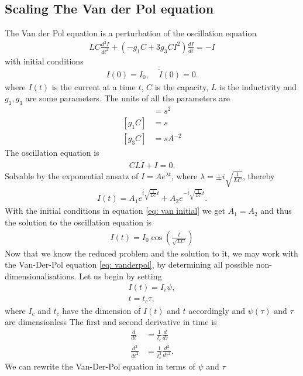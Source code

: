 \documentclass[a4paper]{article}
\begin{document}
\subsection{Scaling The Van der Pol equation}
The Van der Pol equation is a perturbation of the oscillation equation
\begin{align}\label{eq: vanderpol}
    LC\frac{d^2I}{dt^2} + (-g_1C +3g_3CI^2)\frac{dI}{dt} = -I
\end{align}
with initial conditions
\begin{align}\label{eq: van initial}
    I(0) = I_0,\;\;\;\; \dot{I}(0) = 0.
\end{align}
where $I(t)$ is the current at a time $t$, $C$ is the capacity, $L$ is the
inductivity and $g_1, g_3$ are some parameters. The units of all the
parameters are
\begin{align}
    [LC] &= s^2\\
    [g_1C] &= s\\
    [g_3C] &= sA^{-2}
\end{align}
The oscillation equation is
\begin{align}
    CL\ddot{I} + I = 0.
\end{align}
Solvable by the exponential ansatz of $I = Ae^{\lambda t}$, where $\lambda=
\pm i \sqrt{\frac{1}{LC}}$, thereby
\begin{align}
    I(t) = A_1 e^{i\sqrt{\frac{1}{LC}}t} + A_2 e^{-i\sqrt{\frac{1}{LC}}t}.
\end{align}
With the initial conditions in equation \ref{eq: van initial} we get $A_1 =
A_2$ and thus the solution to the oscillation equation is
\begin{align}
    I(t) = I_0\cos(\frac{t}{\sqrt{LC}})
\end{align}
Now that we know the reduced problem and the solution to it, we may work with
the Van-Der-Pol equation \ref{eq: vanderpol}, by determining all possible
non-dimensionalisations. Let us begin by setting
\begin{align}
    I(t) = I_c\psi,\\
    t = t_c \tau,
\end{align}
where $I_c$ and $t_c$ have the dimension of $I(t)$ and $t$ accordingly and
$\psi(\tau)$ and $\tau$ are dimensionless
The first and second derivative in time is
\begin{align}
    \frac{d}{dt} &= \frac{1}{t_c}\frac{d}{d\tau}\\
    \frac{d^2}{dt^2} &= \frac{1}{t_c^2}\frac{d^2}{d\tau^2}.
\end{align}
We can rewrite the Van-Der-Pol equation in terms of $\psi$ and $\tau$
\end{document}
